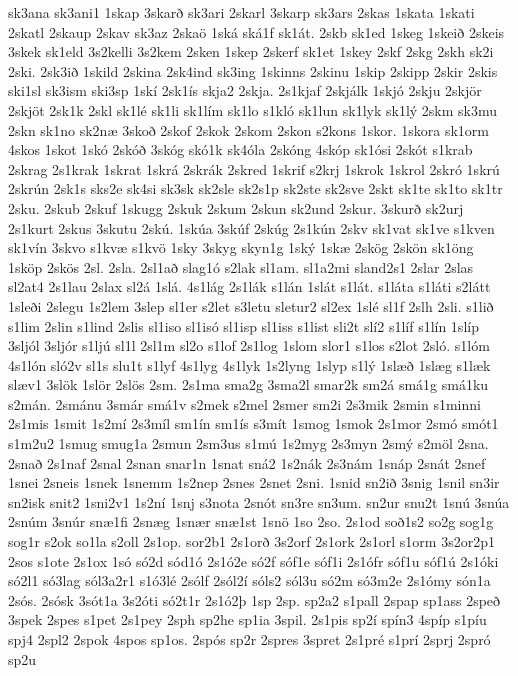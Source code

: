 {sk3ana
sk3ani1
1skap
3skarð
sk3ari
2skarl
3skarp
sk3ars
2skas
1skata
1skati
2skatl
2skaup
2skav
sk3az
2skaö
1ská
ská1f
sk1át.
2skb
sk1ed
1skeg
1skeið
2skeis
3skek
sk1eld
3s2kelli
3s2kem
2sken
1skep
2skerf
sk1et
1skey
2skf
2skg
2skh
sk2i
2ski.
2sk3ið
1skild
2skina
2sk4ind
sk3ing
1skinns
2skinu
1skip
2skipp
2skir
2skis
ski1sl
sk3ism
ski3sp
1skí
2sk1ís
skja2
2skja.
2s1kjaf
2skjálk
1skjó
2skju
2skjör
2skjöt
2sk1k
2skl
sk1lé
sk1li
sk1lím
sk1lo
s1kló
sk1lun
sk1lyk
sk1lý
2skm
sk3mu
2skn
sk1no
sk2næ
3skoð
2skof
2skok
2skom
2skon
s2kons
1skor.
1skora
sk1orm
4skos
1skot
1skó
2skóð
3skóg
skó1k
sk4óla
2skóng
4skóp
sk1ósi
2skót
s1krab
2skrag
2s1krak
1skrat
1skrá
2skrák
2skred
1skrif
s2krj
1skrok
1skrol
2skró
1skrú
2skrún
2sk1s
sks2e
sk4si
sk3sk
sk2sle
sk2s1p
sk2ste
sk2sve
2skt
sk1te
sk1to
sk1tr
2sku.
2skub
2skuf
1skugg
2skuk
2skum
2skun
sk2und
2skur.
3skurð
sk2urj
2s1kurt
2skus
3skutu
2skú.
1skúa
3skúf
2skúg
2s1kún
2skv
sk1vat
sk1ve
s1kven
sk1vín
3skvo
s1kvæ
s1kvö
1sky
3skyg
skyn1g
1ský
1skæ
2skög
2skön
sk1öng
1sköp
2skös
2sl.
2sla.
2sl1að
slag1ó
s2lak
sl1am.
sl1a2mi
sland2s1
2slar
2slas
sl2at4
2s1lau
2slax
sl2á
1slá.
4s1lág
2s1lák
s1lán
1slát
s1lát.
s1láta
s1láti
s2látt
1sleði
2slegu
1s2lem
3slep
sl1er
s2let
s3letu
sletur2
sl2ex
1slé
sl1f
2slh
2sli.
s1lið
s1lim
2slin
s1lind
2slis
sl1iso
sl1isó
sl1isp
sl1iss
s1list
sli2t
slí2
s1líf
s1lín
1slíp
3sljól
3sljór
s1ljú
sl1l
2sl1m
sl2o
s1lof
2s1log
1slom
slor1
s1los
s2lot
2sló.
s1lóm
4s1lón
sló2v
sl1s
slu1t
s1lyf
4s1lyg
4s1lyk
1s2lyng
1slyp
s1lý
1slæð
1slæg
s1læk
slæv1
3slök
1slör
2slös
2sm.
2s1ma
sma2g
3sma2l
smar2k
sm2á
smá1g
smá1ku
s2mán.
2smánu
3smár
smá1v
s2mek
s2mel
2smer
sm2i
2s3mik
2smin
s1minni
2s1mis
1smit
1s2mí
2s3míl
sm1ín
sm1ís
s3mít
1smog
1smok
2s1mor
2smó
smót1
s1m2u2
1smug
smug1a
2smun
2sm3us
s1mú
1s2myg
2s3myn
2smý
s2möl
2sna.
2snað
2s1naf
2snal
2snan
snar1n
1snat
sná2
1s2nák
2s3nám
1snáp
2snát
2snef
1snei
2sneis
1snek
1snemm
1s2nep
2snes
2snet
2sni.
1snid
sn2ið
3snig
1snil
sn3ir
sn2isk
snit2
1sni2v1
1s2ní
1snj
s3nota
2snót
sn3re
sn3um.
sn2ur
snu2t
1snú
3snúa
2snúm
3snúr
snæ1fi
2snæg
1snær
snæ1st
1snö
1so
2so.
2s1od
soð1s2
so2g
sog1g
sog1r
s2ok
so1la
s2oll
2s1op.
sor2b1
2s1orð
3s2orf
2s1ork
2s1orl
s1orm
3s2or2p1
2sos
s1ote
2s1ox
1só
só2d
sód1ó
2s1ó2e
só2f
sóf1e
sóf1i
2s1ófr
sóf1u
sóf1ú
2s1óki
só2l1
só3lag
sól3a2r1
s1ó3lé
2sólf
2sól2í
sóls2
sól3u
só2m
só3m2e
2s1ómy
són1a
2sós.
2sósk
3sót1a
3s2óti
só2t1r
2s1ó2þ
1sp
2sp.
sp2a2
s1pall
2spap
sp1ass
2speð
3spek
2spes
s1pet
2s1pey
2sph
sp2he
sp1ia
3spil.
2s1pis
sp2í
spín3
4spíp
s1píu
spj4
2spl2
2spok
4spos
sp1os.
2spós
sp2r
2spres
3spret
2s1pré
s1prí
2sprj
2spró
sp2u
}
